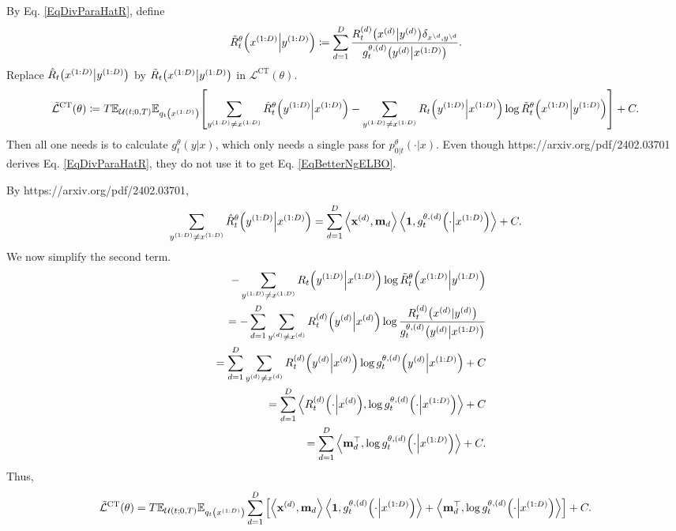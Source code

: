 \documentclass[10pt]{article}
\begin{document}
By Eq. \eqref{EqDivParaHatR}, define
\begin{eqnarray}
  \tilde{R}^\theta_t\qty(x^{(1:D)}\middle|y^{(1:D)})\coloneq\sum_{d=1}^D \frac{R^{(d)}_t\qty(x^{(d)}\middle| y^{(d)})\delta_{x^{\setminus d},y^{\setminus d}}}{g^{\theta,(d)}_t\qty(y^{(d)}\middle|x^{(1:D)})}.
\end{eqnarray}
Replace $\hat{R}_t\qty(x^{(1:D)}\middle|y^{(1:D)})$ by $\tilde{R}_t\qty(x^{(1:D)}\middle|y^{(1:D)})$ in $\mathcal{L}^\text{CT}(\theta)$.
\begin{eqnarray}\label{EqBetterNgELBO}
  \tilde{\mathcal{L}}^\text{CT}(\theta)\coloneq T\mathbb{E}_{\mathcal{U}(t;0,T)}\mathbb{E}_{q_t\qty(x^{(1:D)})}\qty[\sum_{y^{(1:D)}\neq x^{(1:D)}}\hat{R}_t^\theta\qty(y^{(1:D)}\middle|x^{(1:D)}) - \sum_{y^{(1:D)}\neq x^{(1:D)}}R_t\qty(y^{(1:D)}\middle|x^{(1:D)})\log\tilde{R}_t^\theta\qty(x^{(1:D)}\middle|y^{(1:D)})] + C.
\end{eqnarray}
Then all one needs is to calculate $g^\theta_t(y|x)$, which only needs a single pass for $p^\theta_{0|t}(\cdot|x)$. Even though https://arxiv.org/pdf/2402.03701 derives Eq. \eqref{EqDivParaHatR}, they do not use it to get Eq. \eqref{EqBetterNgELBO}.

By https://arxiv.org/pdf/2402.03701,
\begin{eqnarray*}
  \sum_{y^{(1:D)}\neq x^{(1:D)}}\hat{R}_t^\theta\qty(y^{(1:D)}\middle|x^{(1:D)})=\sum_{d=1}^D\left\langle\mathbf{x}^{(d)},\mathbf{m}_d\right\rangle\left\langle\mathbf{1},g^{\theta,(d)}_t\qty(\cdot\middle|x^{(1:D)})\right\rangle + C.
\end{eqnarray*}
We now simplify the second term.
\begin{eqnarray*}
  &&- \sum_{y^{(1:D)}\neq x^{(1:D)}}R_t\qty(y^{(1:D)}\middle|x^{(1:D)})\log\tilde{R}_t^\theta\qty(x^{(1:D)}\middle|y^{(1:D)})\\
  &&=-\sum_{d=1}^D\sum_{y^{(d)}\neq x^{(d)}}R^{(d)}_t\qty(y^{(d)}\middle|x^{(d)})\log\frac{R_t^{(d)}\qty(x^{(d)}|y^{(d)})}{g^{\theta,(d)}_t\qty(y^{(d)}\middle|x^{(1:D)})}\\
  &&=\sum_{d=1}^D\sum_{y^{(d)}\neq x^{(d)}}R^{(d)}_t\qty(y^{(d)}\middle|x^{(d)})\log g^{\theta,(d)}_t\qty(y^{(d)}\middle|x^{(1:D)}) + C\\
  &&=\sum_{d=1}^D \left\langle R^{(d)}_t\qty(\cdot\middle|x^{(d)}),\log g^{\theta,(d)}_t\qty(\cdot\middle|x^{(1:D)})\right\rangle + C\\
  &&=\sum_{d=1}^D \left\langle \mathbf{m}_d^\top,\log g^{\theta,(d)}_t\qty(\cdot\middle|x^{(1:D)})\right\rangle + C.
\end{eqnarray*}
Thus,
\begin{eqnarray*}
  \tilde{\mathcal{L}}^\text{CT}(\theta)=T\mathbb{E}_{\mathcal{U}(t;0,T)}\mathbb{E}_{q_t\qty(x^{(1:D)})}\sum_{d=1}^D\qty[\left\langle\mathbf{x}^{(d)},\mathbf{m}_d\right\rangle\left\langle\mathbf{1},g^{\theta,(d)}_t\qty(\cdot\middle|x^{(1:D)})\right\rangle + \left\langle \mathbf{m}_d^\top,\log g^{\theta,(d)}_t\qty(\cdot\middle|x^{(1:D)})\right\rangle] + C.
\end{eqnarray*}
\end{document}
